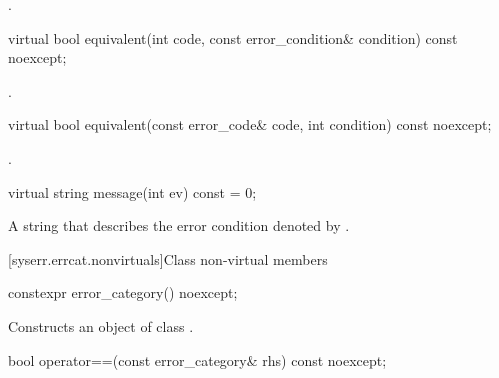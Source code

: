 \begin{itemdescr}
\pnum
\returns
{}.
\end{itemdescr}

\begin{itemdecl}
virtual bool equivalent(int code, const error_condition& condition) const noexcept;
\end{itemdecl}

\begin{itemdescr}
\pnum
\returns {}.
\end{itemdescr}

\begin{itemdecl}
virtual bool equivalent(const error_code& code, int condition) const noexcept;
\end{itemdecl}

\begin{itemdescr}
\pnum
\returns {}.
\end{itemdescr}

\begin{itemdecl}
virtual string message(int ev) const = 0;
\end{itemdecl}

\begin{itemdescr}
\pnum
\returns A string that describes the error condition denoted by .
\end{itemdescr}

[syserr.errcat.nonvirtuals]{Class  non-virtual members}

%
\begin{itemdecl}
constexpr error_category() noexcept;
\end{itemdecl}

\begin{itemdescr}
\pnum
\effects Constructs an object of class .
\end{itemdescr}

\begin{itemdecl}
bool operator==(const error_category& rhs) const noexcept;
\end{itemdecl}

